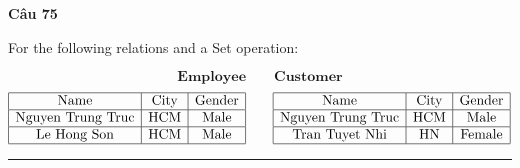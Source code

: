 \documentclass[11pt,a4paper]{article}
\newenvironment{question}[1]{%
  \par\vspace{1em}\noindent\textbf{\large Câu #1}\par\vspace{0.4em}
}{%
  \par\vspace{1em}\hrule\vspace{0.6em}
}
\begin{document}
\begin{question}{75}
For the following relations and a Set operation:

$$\textbf{Employee} \qquad \textbf{Customer}$$
$$\begin{array}{|c|c|c|}
\hline
\text{Name} & \text{City} & \text{Gender} \\
\hline
\text{Nguyen Trung Truc} & \text{HCM} & \text{Male} \\
\hline
\text{Le Hong Son} & \text{HCM} & \text{Male} \\
\hline
\end{array}
\qquad
\begin{array}{|c|c|c|}
\hline
\text{Name} & \text{City} & \text{Gender} \\
\hline
\text{Nguyen Trung Truc} & \text{HCM} & \text{Male} \\
\hline
\text{Tran Tuyet Nhi} & \text{HN} & \text{Female} \\
\hline
\end{array}$$


\end{question}
\end{document}
